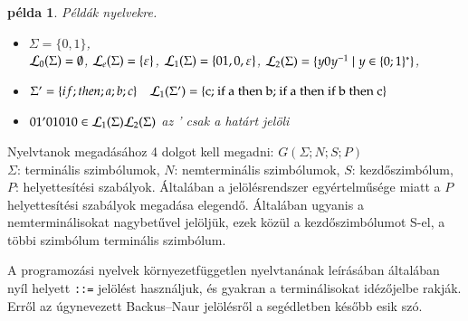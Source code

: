 \documentclass[a4paper]{article}
\newtheorem{pelda}{példa}[section]
\begin{document}
\begin{pelda}
  Példák nyelvekre.
\begin{itemize}
\item $\Sigma=\{0, 1\}$,\\ ${\cal L}_0(\Sigma) = \emptyset$,
	${\cal L}_e(\Sigma) = \{\varepsilon \}$,
	${\cal L}_1(\Sigma) = \{01, 0, \varepsilon \}$,
	${\cal L}_2(\Sigma) = \{y0y^{-1} \mid y\in \{0; 1\}^*\}$,   
\item $\Sigma' = \{ if; then; a; b; c\} \quad {\cal L}_1(\Sigma')=\{\mbox{c; if a then b; if a then
if b then c}\}$
\item $01'01010 \in {\cal L}_1(\Sigma){\cal L}_2(\Sigma)$ \quad az ' csak a határt jelöli
\end{itemize}
\end{pelda}

Nyelvtanok megadásához 4 dolgot kell megadni: $G(\Sigma; N; S; P)$\\
$\Sigma$: terminális szimbólumok, $N$: nemterminális szimbólumok, $S$: kezdőszimbólum, $P$: helyettesítési szabályok.
Általában a jelölésrendszer egyértelműsége miatt a $P$ helyettesítési
szabályok megadása elegendő. Általában ugyanis a nemterminálisokat
nagybetűvel jelöljük, ezek közül a kezdőszimbólumot S-el, a többi
szimbólum terminális szimbólum.

A programozási nyelvek környezetfüggetlen nyelvtanának leírásában
általában nyíl helyett \verb|::=| jelölést használjuk, és gyakran a
terminálisokat idézőjelbe rakják. Erről az úgynevezett Backus--Naur
jelölésről a segédletben később esik szó.
\end{document}
